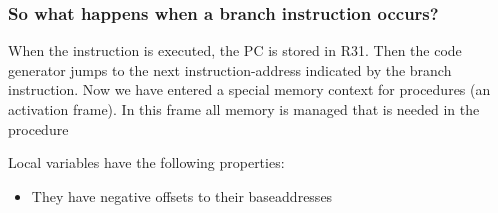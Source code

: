 \subsubsection*{So what happens when a branch instruction occurs?}
When the instruction is executed, the PC is stored in R31. Then the code
generator jumps to the next instruction-address indicated by the branch instruction.
Now we have entered a special memory context for procedures (an activation frame). In this frame all memory is 
managed that is needed in the procedure
\newline
  
 


Local variables have the following properties: 
\begin{itemize}
  \item They have negative offsets to their baseaddresses
\end{itemize}


